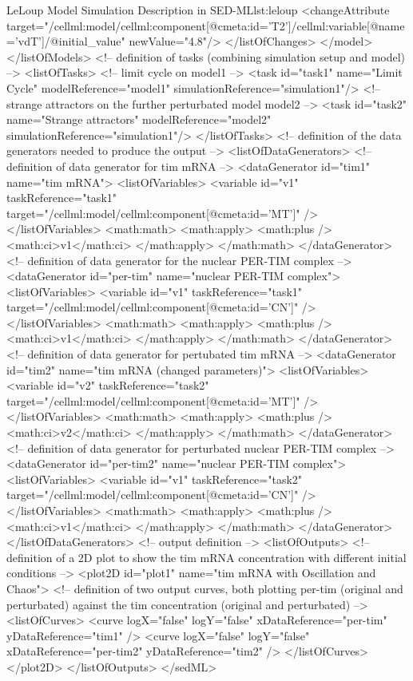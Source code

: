 \begin{myXmlLst}{LeLoup Model Simulation Description in SED-ML}{lst:leloup}
    <changeAttribute target="/cellml:model/cellml:component[@cmeta:id='T2']/cellml:variable[@name='vdT']/@initial_value" newValue="4.8"/>        
   </listOfChanges>
  </model>
 </listOfModels>
 <!-- definition of tasks (combining simulation setup and model) --> 
 <listOfTasks>
  <!-- limit cycle on model1 --> 
  <task id="task1" name="Limit Cycle" modelReference="model1" simulationReference="simulation1"/>
  <!-- strange attractors on the further perturbated model model2 -->
  <task id="task2" name="Strange attractors" modelReference="model2" simulationReference="simulation1"/>
 </listOfTasks>
 <!-- definition of the data generators needed to produce the output -->
 <listOfDataGenerators>
  <!-- definition of data generator for tim mRNA -->
  <dataGenerator id="tim1" name="tim mRNA">
   <listOfVariables>
    <variable id="v1" taskReference="task1" target="/cellml:model/cellml:component[@cmeta:id='MT']" />
   </listOfVariables>
   <math:math>
    <math:apply>
     <math:plus />
     <math:ci>v1</math:ci>
    </math:apply>
   </math:math>
  </dataGenerator>
  <!-- definition of data generator for the nuclear PER-TIM complex -->
  <dataGenerator id="per-tim" name="nuclear PER-TIM complex">
   <listOfVariables>
    <variable id="v1" taskReference="task1" target="/cellml:model/cellml:component[@cmeta:id='CN']" />
   </listOfVariables>
   <math:math>
    <math:apply>
     <math:plus />
     <math:ci>v1</math:ci>
    </math:apply>
   </math:math>
  </dataGenerator>
  <!-- definition of data generator for pertubated tim mRNA -->  
  <dataGenerator id="tim2" name="tim mRNA (changed parameters)">
   <listOfVariables>
    <variable id="v2" taskReference="task2" target="/cellml:model/cellml:component[@cmeta:id='MT']" />
   </listOfVariables>  
   <math:math>
    <math:apply>
     <math:plus />
     <math:ci>v2</math:ci>
    </math:apply>
   </math:math>
  </dataGenerator>
  <!-- definition of data generator for perturbated nuclear PER-TIM complex -->  
  <dataGenerator id="per-tim2" name="nuclear PER-TIM complex">
   <listOfVariables>
    <variable id="v1" taskReference="task2" target="/cellml:model/cellml:component[@cmeta:id='CN']" />
   </listOfVariables>
   <math:math>
    <math:apply>
     <math:plus />
     <math:ci>v1</math:ci>
    </math:apply>
   </math:math>
  </dataGenerator>
 </listOfDataGenerators>
 <!-- output definition --> 
  <listOfOutputs>
   <!-- definition of a 2D plot to show the tim mRNA concentration with different initial conditions -->
   <plot2D id="plot1" name="tim mRNA with Oscillation and Chaos">
    <!-- definition of two output curves, both plotting per-tim (original and perturbated) against the tim concentration (original and perturbated) -->
    <listOfCurves>
     <curve logX="false" logY="false" xDataReference="per-tim" yDataReference="tim1" />
     <curve logX="false" logY="false" xDataReference="per-tim2" yDataReference="tim2" />
    </listOfCurves>
   </plot2D>
  </listOfOutputs>
</sedML>
\end{myXmlLst}



